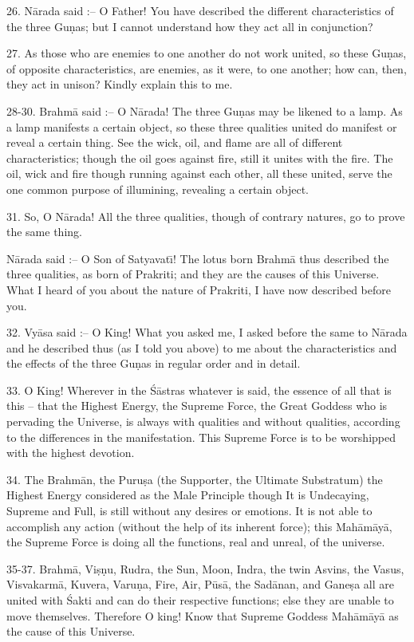 26. N\=arada said :-- O Father! You have described the different characteristics of the three Gu\d{n}as; but I cannot understand how they act all in conjunction?

27. As those who are enemies to one another do not work united, so these Gu\d{n}as, of opposite characteristics, are enemies, as it were, to one another; how can, then, they act in unison? Kindly explain this to me.

28-30. Brahm\=a said :-- O N\=arada! The three Gu\d{n}as may be likened to a lamp. As a lamp manifests a certain object, so these three qualities united do manifest or reveal a certain thing. See the wick, oil, and flame are all of different characteristics; though the oil goes against fire, still it unites with the fire. The oil, wick and fire though running against each other, all these united, serve the one common purpose of illumining, revealing a certain object.

31. So, O N\=arada! All the three qualities, though of contrary natures, go to prove the same thing.

N\=arada said :-- O Son of Satyavat\={\i}! The lotus born Brahm\=a thus described the three qualities, as born of Prakriti; and they are the causes of this Universe. What I heard of you about the nature of Prakriti, I have now described before you.

32. Vy\=asa said :-- O King! What you asked me, I asked before the same to N\=arada and he described thus (as I told you above) to me about the characteristics and the effects of the three Gu\d{n}as in regular order and in detail.

33. O King! Wherever in the \'S\=astras whatever is said, the essence of all that is this -- that the Highest Energy, the Supreme Force, the Great Goddess who is pervading the Universe, is always with qualities and without qualities, according to the differences in the manifestation. This Supreme Force is to be worshipped with the highest devotion.

34. The Brahm\=an, the Puru\d{s}a (the Supporter, the Ultimate Substratum) the Highest Energy considered as the Male Principle though It is Undecaying, Supreme and Full, is still without any desires or emotions. It is not able to accomplish any action (without the help of its inherent force); this Mah\=am\=ay\=a, the Supreme Force is doing all the functions, real and unreal, of the universe.

35-37. Brahm\=a, Vi\d{s}\d{n}u, Rudra, the Sun, Moon, Indra, the twin Asvins, the Vasus, Visvakarm\=a, Kuvera, Varu\d{n}a, Fire, Air, P\=us\=a, the Sad\=anan, and Gane\d{s}a all are united with \'Sakti and can do their respective functions; else they are unable to move themselves. Therefore O king! Know that Supreme Goddess Mah\=am\=ay\=a as the cause of this Universe.

